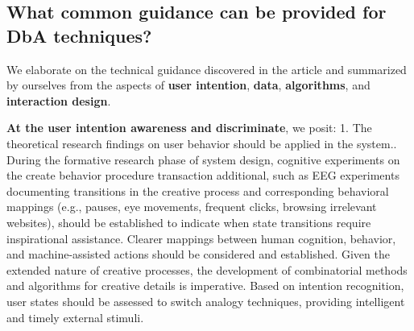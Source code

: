 


\subsection{What common guidance can be provided for DbA techniques?}
We elaborate on the technical guidance discovered in the article and summarized by ourselves from the aspects of \textbf{user intention}, \textbf{data}, \textbf{algorithms}, and \textbf{interaction design}.

\textbf{At the user intention awareness and discriminate}, we posit: 
1. The theoretical research findings on user behavior should be applied in the system.\cite{goel2012cognitive}. During the formative research phase of system design, cognitive experiments on the create behavior procedure transaction additional, such as EEG experiments documenting transitions in the creative process and corresponding behavioral mappings (e.g., pauses, eye movements, frequent clicks, browsing irrelevant websites), should be established to indicate when state transitions require inspirational assistance. Clearer mappings between human cognition, behavior, and machine-assisted actions should be considered and established\cite{borgianni2020forms, goucher2019neuroimaging}. Given the extended nature of creative processes, the development of combinatorial methods and algorithms for creative details is imperative. Based on intention recognition, user states should be assessed to switch analogy techniques, providing intelligent and timely external stimuli.  

